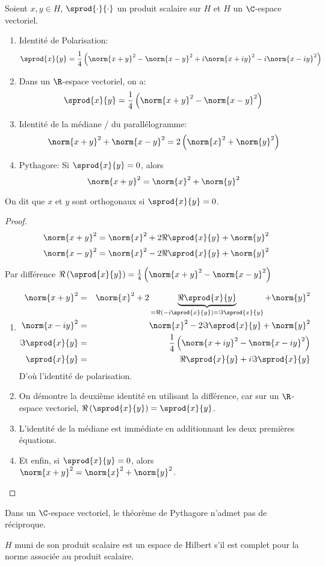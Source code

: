 \begin{prop}
	Soient $x,y \in H$, $\sprod{\cdot}{\cdot}$ un produit scalaire sur $H$ et $H$ un $\C$-espace vectoriel.

	\begin{enumerate}
		\item Identité de Polarisation:
		      $$\sprod{x}{y} = \frac{1}{4} \left( \norm{x+y}^2 - \norm{x-y}^2 + i\norm{x+iy}^2 - i\norm{x-iy}^2 \right)$$
		\item Dans un $\R$-espace vectoriel, on a:
		      $$\sprod{x}{y} = \frac{1}{4} \left( \norm{x+y}^2 - \norm{x-y}^2 \right)$$
		\item Identité de la médiane / du parallélogramme:
		      $$\norm{x+y}^2 + \norm{x-y}^2 = 2\left( \norm{x}^2 + \norm{y}^2 \right)$$
		\item Pythagore: Si $\sprod{x}{y} = 0$, alors
		      $$ \norm{x+y}^2 = \norm{x}^2 + \norm{y}^2$$
	\end{enumerate}
\end{prop}

\begin{definition}
	On dit que $x$ et $y$ sont orthogonaux si $\sprod{x}{y} = 0$.
\end{definition}

\begin{proof}
	$$\norm{x+y}^2  = \norm{x}^2 + 2\Re \sprod{x}{y} + \norm{y}^2 $$
	$$\norm{x-y}^2  = \norm{x}^2 - 2\Re \sprod{x}{y} + \norm{y}^2 $$

	Par différence $\Re \left(\sprod{x}{y}\right) = \frac{1}{4} \left( \norm{x+y}^2 - \norm{x-y}^2 \right)$
	\begin{enumerate}
		\item
		      \begin{eqnarray*}
			      \norm{x+y}^2  &=& \norm{x}^2 + 2\underbrace{\Re \sprod{x}{y} }_{= \Re (-i\sprod{x}{y}) = \Im \sprod{x}{y}} + \norm{y}^2 \\
			      \norm{x-iy}^2 &=& \norm{x}^2 - 2\Im \sprod{x}{y} + \norm{y}^2 \\
			      \Im \sprod{x}{y} &=& \frac{1}{4} \left( \norm{x+iy}^2 - \norm{x-iy}^2 \right)\\
			      \sprod{x}{y} &=& \Re \sprod{x}{y} + i \Im \sprod{x}{y}
		      \end{eqnarray*}
		      D'où l'identité de polarisation.
		\item On démontre la deuxième identité en utilisant la différence, car sur un $\R$-espace vectoriel, $\Re \left(\sprod{x}{y}\right) = \sprod{x}{y}$.
		\item L'identité de la médiane est immédiate en additionnant les deux premières équations.
		\item Et enfin, si $\sprod{x}{y} = 0$, alors $\norm{x+y}^2 = \norm{x}^2 + \norm{y}^2$.
	\end{enumerate} %
\end{proof}


\begin{remarque}
	Dans un $\C$-espace vectoriel, le théorème de Pythagore n'admet pas de réciproque.
\end{remarque}

\begin{definition}
	$H$ muni de son produit scalaire est un espace de Hilbert s'il est complet pour la norme associée au produit scalaire.
\end{definition}

